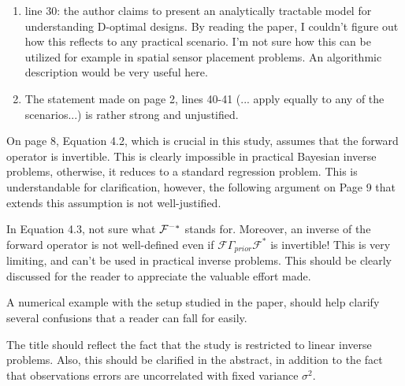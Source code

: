 \documentclass{amsart}
\begin{document}
\begin{enumerate}
\item line 30: the author claims to present an analytically tractable
  model for understanding D-optimal designs. By reading the paper, I
  couldn't figure out how this reflects to any practical scenario. I'm
  not sure how this can be utilized for example in spatial sensor
  placement problems. An algorithmic description would be very useful
  here.

\item The statement made on page 2, lines 40-41 (... apply equally to
  any of the scenarios...) is rather strong and unjustified.
\end{enumerate}

On page 8, Equation 4.2, which is crucial in this study, assumes that
the forward operator is invertible. This is clearly impossible in
practical Bayesian inverse problems, otherwise, it reduces to a
standard regression problem. This is understandable for clarification,
however, the following argument on Page 9 that extends this assumption
is not well-justified.


In Equation 4.3, not sure what $\mathcal{F}^{-*}$ stands for. Moreover, an
inverse of the forward operator is not well-defined even if
$\mathcal{F}\Gamma_{prior}\mathcal{F}^*$ is invertible! This is very
limiting, and can't be used in practical inverse problems. This should
be clearly discussed for the reader to appreciate the valuable effort
made.


A numerical example with the setup studied in the paper, should help
clarify several confusions that a reader can fall for easily.


The title should reflect the fact that the study is restricted to
linear inverse problems. Also, this should be clarified in the
abstract, in addition to the fact that observations errors are
uncorrelated with fixed variance $\sigma^2$.
\end{document}
